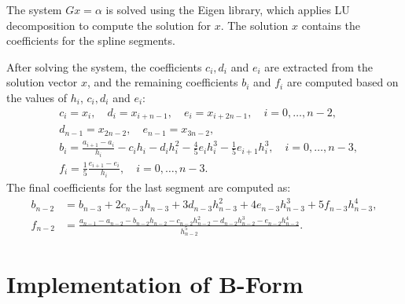 \documentclass{article}
\begin{document}
The system \( Gx = \alpha \) is solved using the Eigen library, which applies LU decomposition to compute the solution for \( x \). The solution \( x \) contains the coefficients for the spline segments.\par
After solving the system, the coefficients \( c_i, d_i \) and \( e_i \) are extracted from the solution vector \( x \), and the remaining coefficients \( b_i \) and \( f_i \) are computed based on the values of \( h_i \), \( c_i, d_i \) and \( e_i \):
\begin{align*}
    &c_i = x_i, \quad d_i = x_{i + n - 1}, \quad e_i = x_{i + 2n - 1},\quad i = 0, \ldots, n-2, \\
    &d_{n-1} = x_{2n - 2}, \quad e_{n-1} = x_{3n - 2},\\
    &b_i = \frac{a_{i+1} - a_i}{h_i} - c_i h_i - d_{i} h_i^2 - \frac{4}{5} e_i h_i^3 - \frac{1}{5} e_{i+1} h_i^3, \quad i = 0, \ldots, n-3, \\
    &f_i = \frac{1}{5} \frac{e_{i+1} - e_i}{h_i}, \quad i = 0, \ldots, n-3.
\end{align*}
The final coefficients for the last segment are computed as:
\begin{align*}
    b_{n-2} &= b_{n-3} + 2 c_{n-3} h_{n-3} + 3 d_{n-3} h_{n-3}^2 + 4 e_{n-3} h_{n-3}^3 + 5 f_{n-3} h_{n-3}^4, \\
    f_{n-2} &= \frac{a_{n-1} - a_{n-2} - b_{n-2} h_{n-2} - c_{n-2} h_{n-2}^2 - d_{n-2} h_{n-2}^3 - e_{n-2} h_{n-2}^4}{h_{n-2}^5}.
\end{align*}


\section{Implementation of B-Form}
\end{document}
